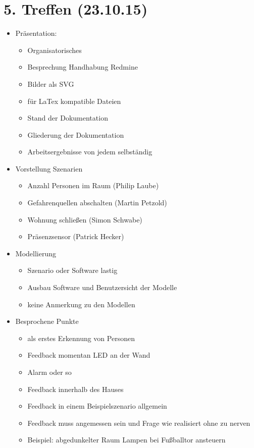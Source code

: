 \section{5. Treffen (23.10.15)}
\begin{itemize}
	\item Präsentation:
	\begin{itemize}
		\item Organisatorisches
		\item Besprechung Handhabung Redmine
		\item Bilder als SVG
		\item für LaTex kompatible Dateien
		\item Stand der Dokumentation
		\item Gliederung der Dokumentation
		\item Arbeitsergebnisse von jedem selbständig
	\end{itemize}
	\item Vorstellung Szenarien
	\begin{itemize}
		\item Anzahl Personen im Raum (Philip Laube)
		\item Gefahrenquellen abschalten (Martin Petzold)
		\item Wohnung schließen (Simon Schwabe)
		\item Präsenzsensor (Patrick Hecker)
	\end{itemize}
	\item Modellierung
	\begin{itemize}
		\item Szenario oder Software lastig
		\item Ausbau Software und Benutzersicht der Modelle
		\item keine Anmerkung zu den Modellen
	\end{itemize}
	\item Besprochene Punkte
	\begin{itemize}
		\item als erstes Erkennung von Personen
		\item Feedback momentan LED an der Wand
		\item Alarm oder so
		\item Feedback innerhalb des Hauses
		\item Feedback in einem Beispielszenario allgemein
		\item Feedback muss angemessen sein und Frage wie realisiert ohne zu nerven
		\item Beispiel: abgedunkelter Raum Lampen bei Fußballtor ansteuern

\end{itemize}
\end{itemize}
